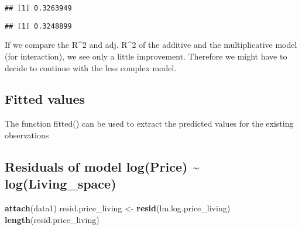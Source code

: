 \documentclass[
]{article}
\newenvironment{Shaded}{\begin{snugshade}}{\end{snugshade}}
\newcommand{\CommentTok}[1]{\textcolor[rgb]{0.56,0.35,0.01}{\textit{#1}}}
\newcommand{\KeywordTok}[1]{\textcolor[rgb]{0.13,0.29,0.53}{\textbf{#1}}}
\newcommand{\NormalTok}[1]{#1}
\newcommand{\OperatorTok}[1]{\textcolor[rgb]{0.81,0.36,0.00}{\textbf{#1}}}
\newcommand{\StringTok}[1]{\textcolor[rgb]{0.31,0.60,0.02}{#1}}
\begin{document}
\begin{Shaded}
\end{Shaded}

\begin{verbatim}
## [1] 0.3263949
\end{verbatim}

\begin{Shaded}
\end{Shaded}

\begin{verbatim}
## [1] 0.3248899
\end{verbatim}

If we compare the R\^{}2 and adj. R\^{}2 of the additive and the
multiplicative model (for interaction), we see only a little
improvement. Therefore we might have to decide to continue with the less
complex model.

\hypertarget{fitted-values}{%
\subsection{Fitted values}\label{fitted-values}}

The function fitted() can be used to extract the predicted values for
the existing observations

\hypertarget{residuals-of-model-logprice-logliving_space}{%
\subsection{Residuals of model log(Price) \textasciitilde{}
log(Living\_space)}\label{residuals-of-model-logprice-logliving_space}}

\begin{Shaded}
\begin{Highlighting}[]
\KeywordTok{attach}\NormalTok{(data1)}
\NormalTok{resid.price_living <-}\StringTok{ }\KeywordTok{resid}\NormalTok{(lm.log.price_living)}
\KeywordTok{length}\NormalTok{(resid.price_living)}
\end{Highlighting}
\end{Shaded}
\end{document}
